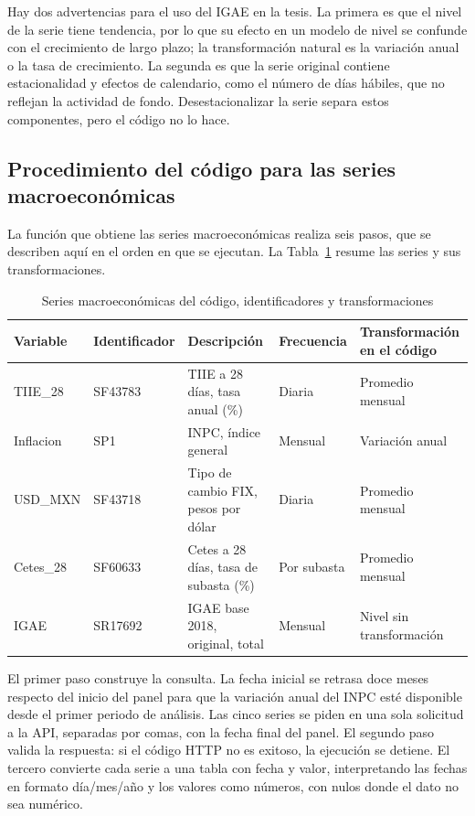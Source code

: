 Hay dos advertencias para el uso del IGAE en la tesis. La primera es que el nivel de la serie tiene tendencia, por lo que su efecto en un modelo de nivel se confunde con el crecimiento de largo plazo; la transformación natural es la variación anual o la tasa de crecimiento. La segunda es que la serie original contiene estacionalidad y efectos de calendario, como el número de días hábiles, que no reflejan la actividad de fondo. Desestacionalizar la serie separa estos componentes, pero el código no lo hace. %

\subsection{Procedimiento del código para las series macroeconómicas}
La función que obtiene las series macroeconómicas realiza seis pasos, que se describen aquí en el orden en que se ejecutan. La Tabla~\ref{tab:series_macro} resume las series y sus transformaciones.

\begin{table}[htbp]
\centering
\small
\caption{Series macroeconómicas del código, identificadores y transformaciones}
\label{tab:series_macro}
\begin{tabular}{llllp{4.6cm}}
\toprule
Variable & Identificador & Descripción & Frecuencia & Transformación en el código \\
\midrule
TIIE\_28 & SF43783 & TIIE a 28 días, tasa anual (\%) & Diaria & Promedio mensual \\
Inflacion & SP1 & INPC, índice general & Mensual & Variación anual \\
USD\_MXN & SF43718 & Tipo de cambio FIX, pesos por dólar & Diaria & Promedio mensual \\
Cetes\_28 & SF60633 & Cetes a 28 días, tasa de subasta (\%) & Por subasta & Promedio mensual \\
IGAE & SR17692 & IGAE base 2018, original, total & Mensual & Nivel sin transformación \\
\bottomrule
\end{tabular}
\end{table}

El primer paso construye la consulta. La fecha inicial se retrasa doce meses respecto del inicio del panel para que la variación anual del INPC esté disponible desde el primer periodo de análisis. Las cinco series se piden en una sola solicitud a la API, separadas por comas, con la fecha final del panel. El segundo paso valida la respuesta: si el código HTTP no es exitoso, la ejecución se detiene. El tercero convierte cada serie a una tabla con fecha y valor, interpretando las fechas en formato día/mes/año y los valores como números, con nulos donde el dato no sea numérico.

